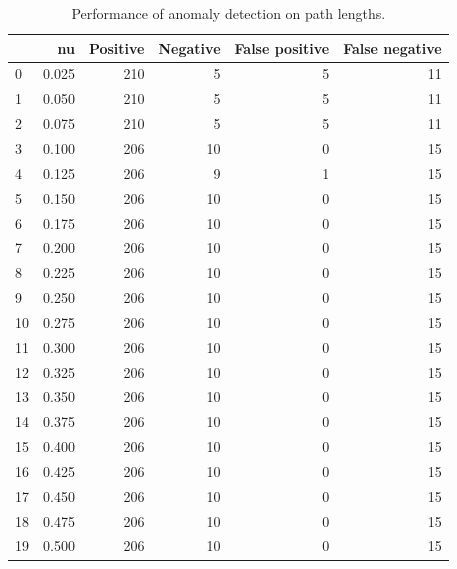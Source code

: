\documentclass[a4paper,twoside,12pt]{book}
\begin{document}
\begin{appendices}
\begin{table}
	\centering
	\caption{Performance of anomaly detection on path lengths.}
	\label{id:tab:pathLenOcSVM}
	\begin{tabular}{lrrrrr}
		\toprule
		{} &     nu &  Positive &  Negative &  False positive &  False negative \\
		\midrule
		0  &  0.025 &       210 &         5 &               5 &              11 \\
		1  &  0.050 &       210 &         5 &               5 &              11 \\
		2  &  0.075 &       210 &         5 &               5 &              11 \\
		3  &  0.100 &       206 &        10 &               0 &              15 \\
		4  &  0.125 &       206 &         9 &               1 &              15 \\
		5  &  0.150 &       206 &        10 &               0 &              15 \\
		6  &  0.175 &       206 &        10 &               0 &              15 \\
		7  &  0.200 &       206 &        10 &               0 &              15 \\
		8  &  0.225 &       206 &        10 &               0 &              15 \\
		9  &  0.250 &       206 &        10 &               0 &              15 \\
		10 &  0.275 &       206 &        10 &               0 &              15 \\
		11 &  0.300 &       206 &        10 &               0 &              15 \\
		12 &  0.325 &       206 &        10 &               0 &              15 \\
		13 &  0.350 &       206 &        10 &               0 &              15 \\
		14 &  0.375 &       206 &        10 &               0 &              15 \\
		15 &  0.400 &       206 &        10 &               0 &              15 \\
		16 &  0.425 &       206 &        10 &               0 &              15 \\
		17 &  0.450 &       206 &        10 &               0 &              15 \\
		18 &  0.475 &       206 &        10 &               0 &              15 \\
		19 &  0.500 &       206 &        10 &               0 &              15 \\

\end{tabular}
\end{table}
\end{appendices}
\end{document}
